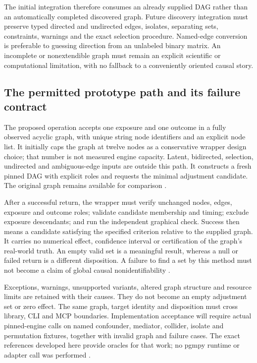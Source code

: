 The initial integration therefore consumes an already supplied DAG rather
than an automatically completed discovered graph. Future discovery
integration must preserve typed directed and undirected edges, isolates,
separating sets, constraints, warnings and the exact selection procedure.
Named-edge conversion is preferable to guessing direction from an unlabeled
binary matrix. An incomplete or nonextendible graph must remain an explicit
scientific or computational limitation, with no fallback to a conveniently
oriented causal story.

\subsection{The permitted prototype path and its failure contract}

The proposed operation accepts one exposure and one outcome in a fully
observed acyclic graph, with unique string node identifiers and an explicit
node list. It initially caps the graph at twelve nodes as a conservative
wrapper design choice; that number is not measured engine capacity.
Latent, bidirected, selection, undirected and ambiguous-edge inputs are
outside this path. It constructs a fresh pinned DAG with explicit roles
and requests the minimal adjustment candidate. The original graph remains
available for comparison \citep{exec13_pgmpy_reuse_oracle}.

After a successful return, the wrapper must verify unchanged nodes, edges,
exposure and outcome roles; validate candidate membership and timing;
exclude exposure descendants; and run the independent graphical check.
Success then means a candidate satisfying the specified criterion relative
to the supplied graph. It carries no numerical effect, confidence interval
or certification of the graph's real-world truth. An empty valid set is
a meaningful result, whereas a null or failed return is a different
disposition. A failure to find a set by this method must not become a
claim of global causal nonidentifiability
\citep{exec13_pgmpy_reuse_oracle}.

Exceptions, warnings, unsupported variants, altered graph structure and
resource limits are retained with their causes. They do not become an
empty adjustment set or zero effect. The same graph, target identity and
disposition must cross library, CLI and MCP boundaries. Implementation
acceptance will require actual pinned-engine calls on named confounder,
mediator, collider, isolate and permutation fixtures, together with invalid
graph and failure cases. The exact references developed here provide
oracles for that work; no pgmpy runtime or adapter call was performed
\citep{exec13_pgmpy_reuse_oracle}.

